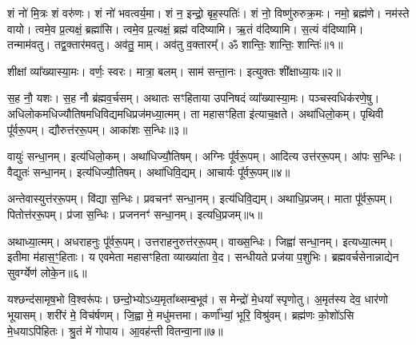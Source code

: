 \setcounter{anuvakam}{0}

शं नो॑ मि॒त्रः शं वरु॑णः। 
शं नो॑ भवत्वर्य॒मा। 
शं न॒ इन्द्रो॒ बृह॒स्पतिः॑। 
शं नो॒ विष्णु॑रुरुक्र॒मः। 
नमो॒ ब्रह्म॑णे। 
नम॑स्ते वायो। 
त्वमे॒व प्र॒त्यक्षं॒ ब्रह्मा॑सि। 
त्वमे॒व प्र॒त्यक्षं॒ ब्रह्म॑ वदिष्यामि। 
ऋ॒तं व॑दिष्यामि। 
स॒त्यं व॑दिष्यामि। 
तन्माम॑वतु। 
तद्व॒क्तार॑मवतु। 
अव॑तु॒ माम्। 
अव॑तु व॒क्तारम्᳚। 
ॐ शान्तिः॒ शान्तिः॒ शान्तिः॑॥१॥%
\anuvakamend[स॒त्यं व॑दिष्यामि॒ पञ्च॑ च]

शीक्षां व्या᳚ख्यास्या॒मः। 
वर्णः॒ स्वरः। 
मात्रा॒ बलम्। 
साम॑ सन्ता॒नः। 
इत्युक्तः शी᳚क्षाध्या॒यः॥२॥
\anuvakamend[शीक्षां पञ्च॑]

स॒ह नौ॒ यशः। 
स॒ह नौ ब्र॑ह्मव॒र्चसम्। 
अथातः सꣳहिताया उपनिषदं व्या᳚ख्यास्या॒मः। 
पञ्चस्वधिक॑रणे॒षु। 
अधिलोकमधि\-ज्यौतिषमधि\-विद्यमधि\-प्रज॑मध्या॒त्मम्। 
ता महासꣳहिता इ॑त्याच॒क्षते। 
अथा॑धिलो॒कम्। 
पृथिवी पू᳚र्वरू॒पम्। 
द्यौरुत्त॑ररू॒पम्। 
आका॑शः स॒न्धिः॥३॥

वायुः॑ सन्धा॒नम्। 
इत्य॑धिलो॒कम्। 
अथा॑धिज्यौ॒तिषम्। 
अग्निः पू᳚र्वरू॒पम्। 
आदित्य उत्त॑ररू॒पम्। 
आ॑पः स॒न्धिः। 
वैद्युतः॑ सन्धा॒नम्। 
इत्य॑धिज्यौ॒तिषम्। 
अथा॑धिवि॒द्यम्। 
आचार्यः पू᳚र्वरू॒पम्॥४॥

अन्तेवास्युत्त॑ररू॒पम्। 
वि॑द्या स॒न्धिः। 
प्रवचनꣳ॑ सन्धा॒नम्। 
इत्य॑धिवि॒द्यम्। 
अथाधि॒प्रजम्। 
माता पू᳚र्वरू॒पम्। 
पितोत्त॑ररू॒पम्। 
प्र॑जा स॒न्धिः। 
प्रजननꣳ॑ सन्धा॒नम्। 
इत्यधि॒प्रजम्॥५॥

अथाध्या॒त्मम्। 
अधराहनुः पू᳚र्वरू॒पम्। 
उत्तराहनुरुत्त॑ररू॒पम्। 
वाख्स॒न्धिः। 
जिह्वा॑ सन्धा॒नम्। 
इत्यध्या॒त्मम्। 
इतीमा म॑हास॒ꣳ॒हिताः। 
य एवमेता महासꣳहिता व्याख्या॑ता वे॒द। 
सन्धीयते प्रज॑या प॒शुभिः। 
ब्रह्मवर्चसेनान्नाद्येन सुवर्ग्येण॑ लोके॒न॥६॥
\anuvakamend[स॒न्धिराचार्यः पू᳚र्वरू॒पमित्यधि॒प्रजं लो॑के॒न]

यश्छन्द॑सामृष॒भो वि॒श्वरू॑पः। 
छन्दो॒भ्योऽध्य॒मृता᳚थ्सम्ब॒भूव॑। 
स मेन्द्रो॑ मे॒धया᳚ स्पृणोतु। 
अ॒मृत॑स्य देव॒ धार॑णो भूयासम्। 
शरी॑रं मे॒ विच॑र्\mbox{}षणम्। 
जि॒ह्वा मे॒ मधु॑मत्तमा। 
कर्णा᳚भ्यां॒ भूरि॒ विश्रु॑वम्। 
ब्रह्म॑णः को॒शो॑ऽसि मे॒धयाऽपि॑हितः। 
श्रु॒तं मे॑ गोपाय। 
आ॒वह॑न्ती वितन्वा॒ना॥७॥

